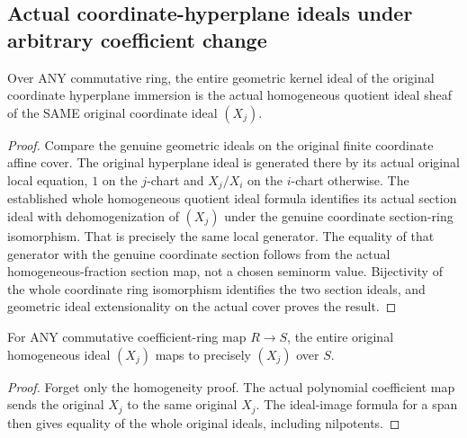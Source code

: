 \subsection{Actual coordinate-hyperplane ideals under arbitrary coefficient change}

\begin{lemma}
\label{projective:actual-coordinate-hyperplane-geometric-kernel}
\leanok
Over ANY commutative ring, the entire geometric kernel ideal of the original
coordinate hyperplane immersion is the actual homogeneous quotient ideal sheaf
of the SAME original coordinate ideal $(X_j)$.
\end{lemma}
\begin{proof}
Compare the genuine geometric ideals on the original finite coordinate affine
cover. The original hyperplane ideal is generated there by its actual original
local equation, $1$ on the $j$-chart and $X_j/X_i$ on the $i$-chart otherwise.
The established whole homogeneous quotient ideal formula identifies its actual
section ideal with dehomogenization of $(X_j)$ under the genuine coordinate
section-ring isomorphism. That is precisely the same local generator.
The equality of that generator with the genuine coordinate section follows
from the actual homogeneous-fraction section map, not a chosen seminorm value.
Bijectivity of the whole coordinate ring isomorphism identifies the two section
ideals, and geometric ideal extensionality on the actual cover proves the result.
\end{proof}

\begin{lemma}
\label{projective:actual-coordinate-hyperplane-ideal-coefficient-map}
\leanok
For ANY commutative coefficient-ring map $R\to S$, the entire original
homogeneous ideal $(X_j)$ maps to precisely $(X_j)$ over $S$.
\end{lemma}
\begin{proof}
Forget only the homogeneity proof. The actual polynomial coefficient map sends
the original $X_j$ to the same original $X_j$. The ideal-image formula for a
span then gives equality of the whole original ideals, including nilpotents.
\end{proof}

